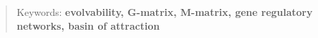 \begin{abstract}

Keywords: \textbf{evolvability, G-matrix, M-matrix, gene regulatory networks, basin of attraction}

\end{abstract}
